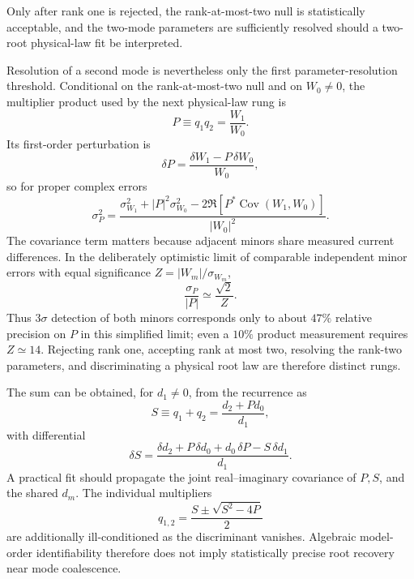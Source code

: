 \documentclass[11pt]{article}
\begin{document}
Only after rank one is rejected, the rank-at-most-two null is statistically acceptable, and the two-mode parameters are sufficiently resolved should a two-root physical-law fit be interpreted.

Resolution of a second mode is nevertheless only the first parameter-resolution threshold.  Conditional on the rank-at-most-two null and on $W_0\neq0$, the multiplier product used by the next physical-law rung is
\begin{equation}
P\equiv q_1q_2=\frac{W_1}{W_0}.
\label{eq:rank2_product_estimator}
\end{equation}
Its first-order perturbation is
\begin{equation}
\boxed{\delta P=\frac{\delta W_1-P\,\delta W_0}{W_0},}
\label{eq:rank2_product_delta}
\end{equation}
so for proper complex errors
\begin{equation}
\boxed{
\sigma_P^2=\frac{\sigma_{W_1}^2+|P|^2\sigma_{W_0}^2-2\Re\!\left[P^*\operatorname{Cov}(W_1,W_0)\right]}{|W_0|^2}.}
\label{eq:rank2_product_cov}
\end{equation}
The covariance term matters because adjacent minors share measured current differences.  In the deliberately optimistic limit of comparable independent minor errors with equal significance $Z=|W_m|/\sigma_{W_m}$,
\begin{equation}
\frac{\sigma_P}{|P|}\simeq\frac{\sqrt2}{Z}.
\end{equation}
Thus $3\sigma$ detection of both minors corresponds only to about $47\%$ relative precision on $P$ in this simplified limit; even a $10\%$ product measurement requires $Z\simeq14$.  Rejecting rank one, accepting rank at most two, resolving the rank-two parameters, and discriminating a physical root law are therefore distinct rungs.

The sum can be obtained, for $d_1\neq0$, from the recurrence as
\begin{equation}
S\equiv q_1+q_2=\frac{d_2+P d_0}{d_1},
\end{equation}
with differential
\begin{equation}
\boxed{\delta S=\frac{\delta d_2+P\,\delta d_0+d_0\,\delta P-S\,\delta d_1}{d_1}.}
\label{eq:rank2_sum_delta}
\end{equation}
A practical fit should propagate the joint real--imaginary covariance of $P,S$, and the shared $d_m$.  The individual multipliers
\begin{equation}
q_{1,2}=\frac{S\pm\sqrt{S^2-4P}}{2}
\end{equation}
are additionally ill-conditioned as the discriminant vanishes.  Algebraic model-order identifiability therefore does not imply statistically precise root recovery near mode coalescence.
\end{document}
